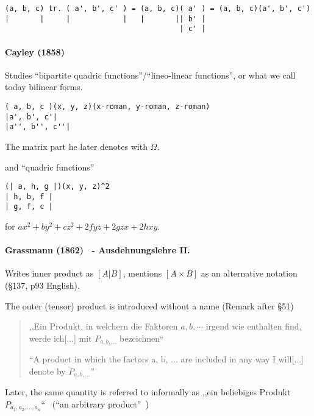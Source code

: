 \begin{verbatim}
(a, b, c) tr. ( a', b', c' ) = (a, b, c)( a' ) = (a, b, c)(a', b', c')
|       |     |            |   |       || b' |
                                        | c' |
\end{verbatim}

\paragraph{Cayley (1858)~\cite{Cayley1858b}}

Studies ``bipartite quadric functions''/``lineo-linear functions'', or what we
call today bilinear forms.

\begin{verbatim}
( a, b, c )(x, y, z)(x-roman, y-roman, z-roman)
|a', b', c'|
|a'', b'', c''|
\end{verbatim}

The matrix part he later denotes with $\Omega$.

and ``quadric functions''

\begin{verbatim}
(| a, h, g |)(x, y, z)^2
| h, b, f |
| g, f, c |
\end{verbatim}

for $ax^2 + by^2 + cz^2 + 2fyz + 2gzx + 2hxy$.



\paragraph{Grassmann (1862)~\cite{Grassmann1862,Grassmann2000} - Ausdehnungslehre II.}

Writes inner product as $[A | B]$, mentions $[A \times B]$ as an alternative notation (\S 137, p93 English).

The outer (tensor) product is introduced without a name (Remark after \S 51)

\begin{quote}
,,Ein Produkt, in welchern die Faktoren $a, b, \cdots$ irgend wie enthalten find, werde ich[...] mit $P_{a,b,...}$ bezeichnen`` \cite[p. 24, \S 43]{Grassmann1862}

``A product in which the factors a, b, ... are included in any way I will[...] denote by $P_{a,b,...}$''~\cite[p. 22, \S 43]{Grassmann2000}
\end{quote}

Later, the same quantity is referred to informally as
,,ein beliebiges Produkt $P_{a_1, a_2, ..., a_n}$``~\cite[\S 353]{Grassmann1862} (``an arbitrary product''~\cite[p. 196, \S 353]{Grassmann2000})

